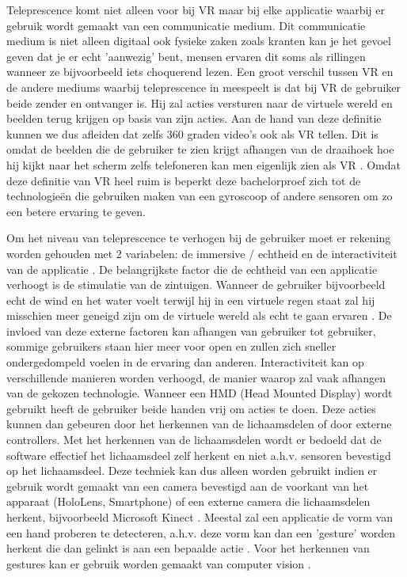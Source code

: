 Teleprescence komt niet alleen voor bij VR maar bij elke applicatie waarbij er gebruik wordt gemaakt van een communicatie medium. Dit communicatie medium is niet alleen digitaal ook fysieke zaken zoals kranten kan je het gevoel geven dat je er echt 'aanwezig' bent, mensen ervaren dit soms als rillingen wanneer ze bijvoorbeeld iets choquerend lezen. 
Een groot verschil tussen VR en de andere mediums waarbij teleprescence in meespeelt is dat bij VR de gebruiker beide zender en ontvanger is. Hij zal acties versturen naar de virtuele wereld en beelden terug krijgen op basis van zijn acties.
Aan de hand van deze definitie kunnen we dus afleiden dat zelfs 360 graden video's ook als VR tellen. Dit is omdat de beelden die de gebruiker te zien krijgt afhangen van de draaihoek hoe hij kijkt naar het scherm zelfs telefoneren kan men eigenlijk zien als VR \autocite{Steuer1992}.
Omdat deze definitie van VR heel ruim is beperkt deze bachelorproef zich tot de technologieën die gebruiken maken van een gyroscoop of andere sensoren om zo een betere ervaring te geven.

Om het niveau van teleprescence te verhogen bij de gebruiker moet er rekening worden gehouden met 2 variabelen: de immersive / echtheid en de interactiviteit van de applicatie \autocite{Steuer1992}.
De belangrijkste factor die de echtheid van een applicatie verhoogt is de stimulatie van de zintuigen. Wanneer de gebruiker bijvoorbeeld echt de wind en het water voelt terwijl hij in een virtuele regen staat zal hij misschien meer geneigd zijn om de virtuele wereld als echt te gaan ervaren \autocite{Steuer1992}. De invloed van deze externe factoren kan afhangen van gebruiker tot gebruiker, sommige gebruikers staan hier meer voor open en zullen zich sneller ondergedompeld voelen in de ervaring dan anderen.
Interactiviteit kan op verschillende manieren worden verhoogd, de manier waarop zal vaak afhangen van de gekozen technologie. Wanneer een HMD (Head Mounted Display) wordt gebruikt heeft de gebruiker beide handen vrij om acties te doen. Deze acties kunnen dan gebeuren door het herkennen van de lichaamsdelen of door externe controllers.
Met het herkennen van de lichaamsdelen wordt er bedoeld dat de software effectief het lichaamsdeel zelf herkent en niet a.h.v. sensoren bevestigd op het lichaamsdeel. Deze techniek kan dus alleen worden gebruikt indien er gebruik wordt gemaakt van een camera bevestigd aan de voorkant van het apparaat (HoloLens, Smartphone) of een externe camera die lichaamsdelen herkent, bijvoorbeeld Microsoft Kinect \autocite{Ren2013}.
Meestal zal een applicatie de vorm van een hand proberen te detecteren, a.h.v. deze vorm kan dan een 'gesture' worden herkent die dan gelinkt is aan een bepaalde actie \autocite{Piumsomboon2013}. 
Voor het herkennen van gestures kan er gebruik worden gemaakt van computer vision \autocite{Ji2013}.


